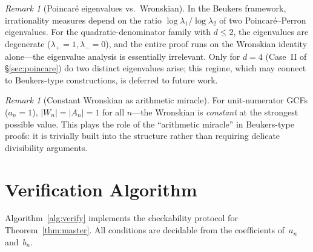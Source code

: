 \documentclass[11pt,a4paper]{article}
\theoremstyle{definition}
\theoremstyle{remark}
\newtheorem{remark}[theorem]{Remark}
\newcommand{\abs}[1]{\lvert #1 \rvert}
\begin{document}
\begin{remark}[Poincar\'e eigenvalues vs.\ Wronskian]
In the Beukers framework, irrationality measures depend on the ratio
$\log\lambda_1/\log\lambda_2$ of two Poincar\'e--Perron eigenvalues.
For the quadratic-denominator family with $d \leq 2$, the eigenvalues
are degenerate ($\lambda_+ = 1, \lambda_- = 0$), and the entire proof
runs on the Wronskian identity alone---the eigenvalue analysis is
essentially irrelevant.  Only for $d = 4$ (Case~II of \S\ref{sec:poincare})
do two distinct eigenvalues arise; this regime, which may connect to
Beukers-type constructions, is deferred to future work.
\end{remark}

\begin{remark}[Constant Wronskian as arithmetic miracle]
For unit-numerator GCFs ($a_n = 1$),
$\abs{W_n} = \abs{A_n} = 1$ for all $n$---the Wronskian is
\emph{constant} at the strongest possible value.
This plays the role of the ``arithmetic miracle'' in Beukers-type
proofs: it is trivially built into the structure rather than requiring
delicate divisibility arguments.
\end{remark}


\section{Verification Algorithm}\label{sec:algorithm}

Algorithm~\ref{alg:verify} implements the checkability protocol for
Theorem~\ref{thm:master}.  All conditions are decidable from the
coefficients of~$a_n$ and~$b_n$.
\end{document}
